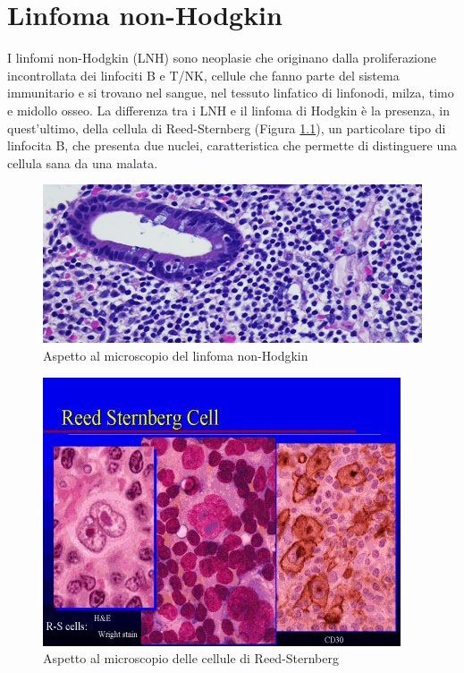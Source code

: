 \chapter{Linfoma non-Hodgkin}

I linfomi non-Hodgkin (LNH) sono neoplasie che originano dalla proliferazione incontrollata dei linfociti B e T/NK, 
cellule che fanno parte del sistema immunitario e si trovano nel sangue, nel tessuto linfatico di linfonodi, milza, 
timo e midollo osseo\cite{LNHAIL}. La differenza tra i LNH e il linfoma di Hodgkin è la presenza, in quest'ultimo,
della cellula di Reed-Sternberg (Figura \ref{fig:FIGURE_2.2}), un particolare tipo di linfocita B, che presenta due nuclei, 
caratteristica che permette di distinguere una cellula sana da una malata\cite{LNHAIMAC}.\\

\begin{figure}[H]
    \begin{center}
    \includegraphics[width=0.6\columnwidth]{img/Linfoma-non-Hodgkin.jpeg}
    \vspace{-3mm}
    \end{center}
    \caption{Aspetto al microscopio del linfoma non-Hodgkin
    \cite{LNHAIL}}

\end{figure}

\begin{figure}[H]
    \begin{center}
    \includegraphics[width=0.5\columnwidth]{img/Reed-Sternberg.jpeg}
    \vspace{-3mm}
    \end{center}
    \caption{Aspetto al microscopio delle cellule di Reed-Sternberg
    \cite{MSD}}
    \label{fig:FIGURE_2.2}
\end{figure}

